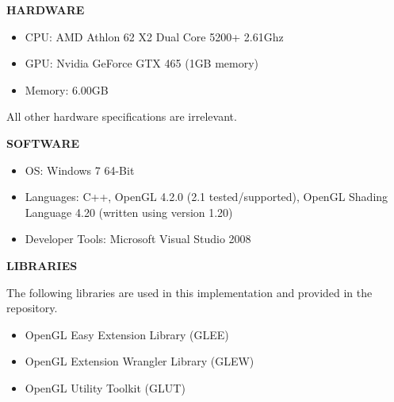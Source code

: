 \vspace{10 mm}

\textbf{HARDWARE}
\begin{itemize}
\item CPU: AMD Athlon 62 X2 Dual Core 5200+ 2.61Ghz
\item GPU: Nvidia GeForce GTX 465 (1GB memory)
\item Memory: 6.00GB
\end{itemize}

All other hardware specifications are irrelevant.

\vspace{10 mm}

\textbf{SOFTWARE}
\begin{itemize}
\item OS: Windows 7 64-Bit
\item Languages: C++, OpenGL 4.2.0 (2.1 tested/supported), OpenGL Shading Language 4.20 (written using version 1.20)
\item Developer Tools: Microsoft Visual Studio 2008
\end{itemize}

\vspace{10 mm}

\textbf{LIBRARIES}

\vspace{1 mm}

The following libraries are used in this implementation and provided in the repository.

\begin{itemize}
\item OpenGL Easy Extension Library (GLEE)
\item OpenGL Extension Wrangler Library (GLEW)
\item OpenGL Utility Toolkit (GLUT)
\end{itemize}

